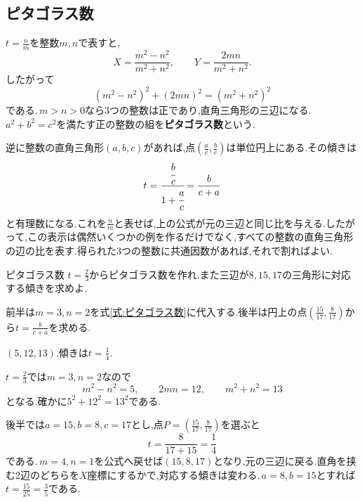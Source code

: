 \subsection{ピタゴラス数}

$t=\frac nm$を整数$m,n$で表すと,
\[
X=\frac{m^2-n^2}{m^2+n^2},\qquad
Y=\frac{2mn}{m^2+n^2}.
\]
したがって
\begin{equation}\label{式:ピタゴラス数}
(m^2-n^2)^2+(2mn)^2=(m^2+n^2)^2
\end{equation}
である.\,$m>n>0$なら3つの整数は正であり,直角三角形の三辺になる.\,$a^2+b^2=c^2$を満たす正の整数の組を\textbf{ピタゴラス数}という.

逆に整数の直角三角形$(a,b,c)$があれば,点$\left(\frac ac,\frac bc\right)$は単位円上にある.その傾きは
\[
t=\cfrac{\cfrac bc}{1+\cfrac ac}=\frac{b}{c+a}
\]
と有理数になる.これを$\frac nm$と表せば,上の公式が元の三辺と同じ比を与える.したがって,この表示は偶然いくつかの例を作るだけでなく,すべての整数の直角三角形の辺の比を表す.得られた3つの整数に共通因数があれば,それで割ればよい.

\begin{example}{ピタゴラス数}
$t=\frac23$からピタゴラス数を作れ.また三辺が$8,15,17$の三角形に対応する傾きを求めよ.
\end{example}

前半は$m=3$,\,$n=2$を式\eqref{式:ピタゴラス数}に代入する.後半は円上の点$\left(\frac{15}{17},\frac8{17}\right)$から$t=\frac{b}{c+a}$を求める.

$(5,12,13)$.傾きは$t=\frac14$.

$t=\frac23$では$m=3$,\,$n=2$なので
\[
m^2-n^2=5,\qquad2mn=12,\qquad m^2+n^2=13
\]
となる.確かに$5^2+12^2=13^2$である.

後半では$a=15$,\,$b=8$,\,$c=17$とし,点$P=\left(\frac{15}{17},\frac8{17}\right)$を選ぶと
\[
t=\frac8{17+15}=\frac14
\]
である.\,$m=4$,\,$n=1$を公式へ戻せば$(15,8,17)$となり,元の三辺に戻る.直角を挟む2辺のどちらを$X$座標にするかで,対応する傾きは変わる.\,$a=8$,\,$b=15$とすれば$t=\frac{15}{25}=\frac35$である.

